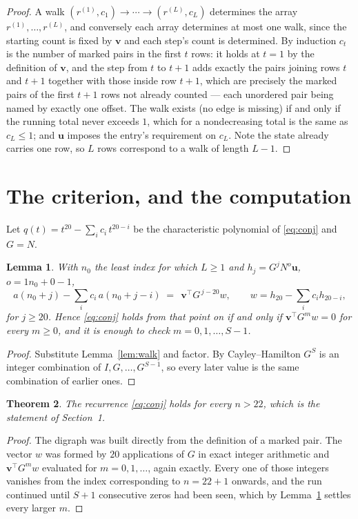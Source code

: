 \documentclass[11pt,a4paper]{article}
\theoremstyle{plain}
\newtheorem{theorem}{Theorem}
\newtheorem{lemma}[theorem]{Lemma}
\theoremstyle{definition}
\begin{document}
\begin{proof}
A walk $(r^{(1)},c_1)\to\cdots\to(r^{(L)},c_L)$ determines the array
$r^{(1)},\dots,r^{(L)}$, and conversely each array determines at most one walk, since the
starting count is fixed by $\mathbf{v}$ and each step's count is determined. By induction
$c_t$ is the number of marked pairs in the first $t$ rows: it holds at $t=1$ by the
definition of $\mathbf{v}$, and the step from $t$ to $t+1$ adds exactly the pairs joining
rows $t$ and $t+1$ together with those inside row $t+1$, which are precisely the marked
pairs of the first $t+1$ rows not already counted --- each unordered pair being named by
exactly one offset. The walk exists (no edge is missing) if and only if the running total
never exceeds $1$, which for a nondecreasing total is the same as $c_L\le1$; and
$\mathbf{u}$ imposes the entry's requirement on $c_L$. Note the state already carries one
row, so $L$ rows correspond to a walk of length $L-1$.
\end{proof}

\section{The criterion, and the computation}

Let $q(t)=t^{20}-\sum_i c_i\,t^{20-i}$ be the characteristic polynomial of
\eqref{eq:conj} and $G=N$.

\begin{lemma}\label{lem:crit}
With $n_0$ the least index for which $L\ge1$ and $h_j=G^{j}N^{o}\mathbf{u}$,
$o=1n_0+0-1$,
\[
a(n_0+j)-\sum_i c_i\,a(n_0+j-i)\;=\;\,\mathbf{v}^{\!\top}G^{\,j-20}w,
\qquad w=h_{20}-\sum_i c_i h_{20-i},
\]
for $j\ge20$. Hence \eqref{eq:conj} holds from that point on if and only if
$\mathbf{v}^{\!\top}G^{m}w=0$ for every $m\ge0$, and it is enough to check
$m=0,1,\dots,S-1$.
\end{lemma}

\begin{proof}
Substitute Lemma~\ref{lem:walk} and factor. By Cayley--Hamilton $G^{S}$ is an integer
combination of $I,G,\dots,G^{S-1}$, so every later value is the same combination of earlier
ones.
\end{proof}

\begin{theorem}
The recurrence \eqref{eq:conj} holds for every $n>22$, which is the statement of
Section~1.
\end{theorem}

\begin{proof}
The digraph was built directly from the definition of a marked pair. The vector $w$ was
formed by $20$ applications of $G$ in exact integer arithmetic and
$\mathbf{v}^{\!\top}G^{m}w$ evaluated for $m=0,1,\dots$, again exactly. Every one of
those integers vanishes from the index corresponding to $n=22+1$ onwards, and the run
continued until $S+1$ consecutive zeros had been seen, which by Lemma~\ref{lem:crit}
settles every larger $m$.
\end{proof}
\end{document}
